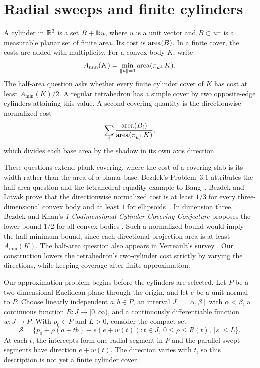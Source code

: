 \section{Radial sweeps and finite cylinders}
\label{sec:introduction}

A cylinder in $\mathbb R^3$ is a set $B+\mathbb R u$, where $u$ is a unit vector
and $B\subset u^\perp$ is a measurable planar set of finite area.
Its cost is $\operatorname{area}(B)$. In a finite cover, the costs are added with
multiplicity. For a convex body $K$, write
\[
 A_{\min}(K)=\min_{\lVert u\rVert=1}\operatorname{area}(\pi_{u^\perp}K).
\]
The half-area question asks whether every finite cylinder cover of $K$
has cost at least $A_{\min}(K)/2$. A regular tetrahedron has a simple
cover by two opposite-edge cylinders attaining this value.
A second covering quantity is the directionwise normalized cost
\[
 \sum_i\frac{\operatorname{area}(B_i)}{\operatorname{area}(\pi_{u_i^\perp}K)},
\]
which divides each base area by the shadow in its own axis direction.

These questions extend plank covering, where the cost of a covering
slab is its width rather than the area of a planar base. Bezdek's
Problem~3.1 attributes the half-area question and the tetrahedral
equality example to Bang~\cite{Bezdek2009}.
Bezdek and Litvak prove that the directionwise normalized cost is at
least \(1/3\) for every three-dimensional convex body and at least \(1\)
for ellipsoids~\cite[Theorem~3.1]{BL2009}. In dimension three, Bezdek
and Khan's \emph{1-Codimensional Cylinder Covering Conjecture} proposes
the lower bound \(1/2\) for all convex bodies
\cite[Definition~3 and Conjecture~4.13]{BK2016}.
Such a normalized bound would imply the half-minimum bound, since
each directional projection area is at least \(A_{\min}(K)\).
The half-area question also appears in Verreault's survey
\cite[Question~4.14]{Verreault2026}. Our construction lowers the
tetrahedron's two-cylinder cost strictly by varying the directions,
while keeping coverage after finite approximation.

Our approximation problem begins before the cylinders are selected.
Let $P$ be a two-dimensional Euclidean plane through the origin, and
let $e$ be a unit normal to $P$. Choose linearly independent
$a,b\in P$, an interval $J=[\alpha,\beta]$ with $\alpha<\beta$,
a continuous function $R:J\to[0,\infty)$, and a continuously
differentiable function $w:J\to P$. With $p_0\in P$ and $L>0$,
consider the compact set
\begin{equation}\label{eq:radial-sweep}
 \mathcal S=\{p_0+\rho(a+tb)+s(e+w(t)):
          t\in J,\ 0\le\rho\le R(t),\ |s|\le L\}.
\end{equation}
At each $t$, the intercepts form one radial segment in $P$ and the
parallel swept segments have direction $e+w(t)$. The direction varies
with $t$, so this description is not yet a finite cylinder cover.

